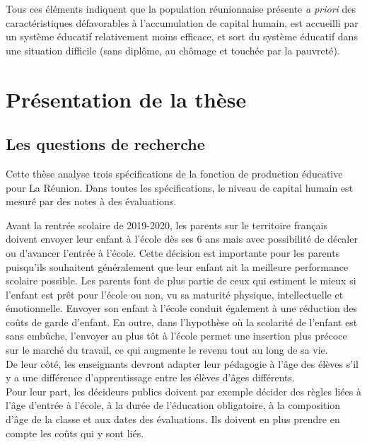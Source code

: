 \documentclass[
]{book}
\begin{document}
\quad Tous ces éléments indiquent que la population réunionnaise présente \emph{a priori} des caractéristiques défavorables à l'accumulation de capital humain, est accueilli par un système éducatif relativement moins efficace, et sort du système éducatif dans une situation difficile (sans diplôme, au chômage et touchée par la pauvreté).

\hypertarget{pruxe9sentation-de-la-thuxe8se}{%
\section*{Présentation de la thèse}\label{pruxe9sentation-de-la-thuxe8se}}

\hypertarget{les-questions-de-recherche}{%
\subsection*{Les questions de recherche}\label{les-questions-de-recherche}}

Cette thèse analyse trois spécifications de la fonction de production éducative pour La Réunion. Dans toutes les spécifications, le niveau de capital humain est mesuré par des notes à des évaluations.

\quad Avant la rentrée scolaire de 2019-2020, les parents sur le territoire français doivent envoyer leur enfant à l'école dès ses 6 ans mais avec possibilité de décaler ou d'avancer l'entrée à l'école. Cette décision est importante pour les parents puisqu'ils souhaitent généralement que leur enfant ait la meilleure performance scolaire possible. Les parents font de plus partie de ceux qui estiment le mieux si l'enfant est prêt pour l'école ou non, vu sa maturité physique, intellectuelle et émotionnelle. Envoyer son enfant à l'école conduit également à une réduction des coûts de garde d'enfant. En outre, dans l'hypothèse où la scolarité de l'enfant est sans embûche, l'envoyer au plus tôt à l'école permet une insertion plus précoce sur le marché du travail, ce qui augmente le revenu tout au long de sa vie.\\
De leur côté, les enseignants devront adapter leur pédagogie à l'âge des élèves s'il y a une différence d'apprentissage entre les élèves d'âges différents. \\
Pour leur part, les décideurs publics doivent par exemple décider des règles liées à l'âge d'entrée à l'école, à la durée de l'éducation obligatoire, à la composition d'âge de la classe et aux dates des évaluations. Ils doivent en plus prendre en compte les coûts qui y sont liés.
\end{document}
